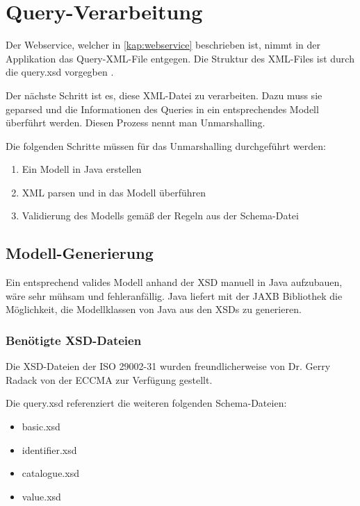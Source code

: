 \section{Query-Verarbeitung}\label{sec:query_vearbeitung}

Der \gls{Webservice}, welcher in \autoref{kap:webservice} beschrieben ist, nimmt in der Applikation das Query-XML-File entgegen. 
Die Struktur des XML-Files ist durch die query.xsd vorgegben \citep[27]{iso29002-31}. 

Der nächste Schritt ist es, diese XML-Datei zu verarbeiten. Dazu muss sie geparsed und die Informationen des Queries in ein entsprechendes Modell überführt werden. Diesen Prozess nennt man \gls{Unmarshalling}. 

Die folgenden Schritte müssen für das \gls{Unmarshalling} durchgeführt werden:

\begin{enumerate}
\item Ein Modell in Java erstellen
\item XML parsen und in das Modell überführen
\item Validierung des Modells gemäß der Regeln aus der Schema-Datei
\end{enumerate}

\subsection{Modell-Generierung}\label{sec:modellgenerierung}

Ein entsprechend valides Modell anhand der XSD manuell in Java aufzubauen, wäre sehr mühsam und fehleranfällig. Java liefert mit der \gls{JAXB} Bibliothek die Möglichkeit, die Modellklassen von Java aus den XSDs zu generieren.

\subsubsection{Benötigte XSD-Dateien}

Die XSD-Dateien der ISO 29002-31 wurden freundlicherweise von Dr. Gerry Radack von der \gls{ECCMA} zur Verfügung gestellt. 

Die query.xsd referenziert die weiteren folgenden Schema-Dateien:
\begin{itemize}
\item basic.xsd
\item identifier.xsd
\item catalogue.xsd
\item value.xsd
\end{itemize}

